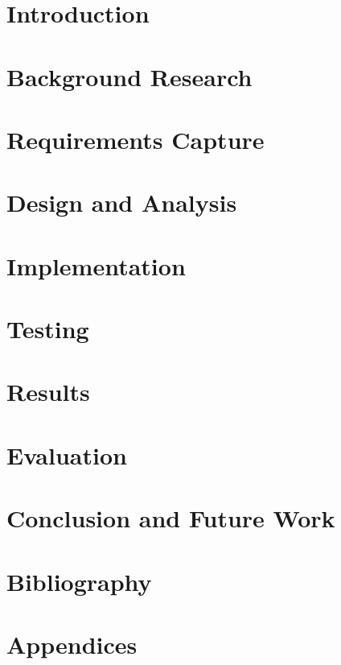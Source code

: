 \documentclass[12pt,a4paper]{report}
\begin{document}

\tableofcontents

\chapter{Introduction}\label{chp:int}


\chapter{Background Research}\label{chp:bac}


\chapter{Requirements Capture}\label{chp:req}


\chapter{Design and Analysis}\label{chp:des}


\chapter{Implementation}\label{chp:imp}


\chapter{Testing}\label{chp:tes}


\chapter{Results}\label{chp:res}


\chapter{Evaluation}\label{chp:eva}


\chapter{Conclusion and Future Work}\label{chp:con}


\chapter{Bibliography}\label{chp:bib}
\begingroup
	\def\chapter*#1{}


\endgroup

\chapter{Appendices}\label{chp:app}
\renewcommand{\thesection}{\Alph{section}}

\end{document}
